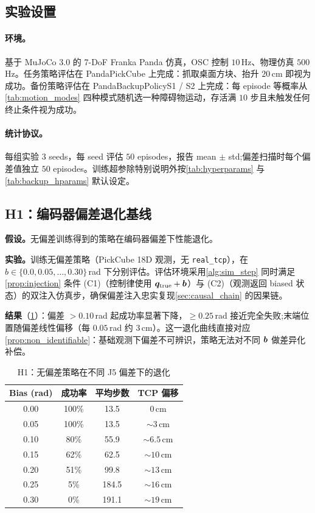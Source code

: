 \subsection{实验设置}\label{sec:sim_exp_setup}

\paragraph{环境。}基于 MuJoCo 3.0 的 7-DoF Franka Panda 仿真，OSC 控制 $10$\,Hz、物理仿真 $500$\,Hz。任务策略评估在 PandaPickCube 上完成：抓取桌面方块、抬升 $20$\,cm 即视为成功。备份策略评估在 PandaBackupPolicyS1 / S2 上完成：每 episode 等概率从 \cref{tab:motion_modes} 四种模式随机选一种障碍物运动，存活满 $10$ 步且未触发任何终止条件视为成功。

\paragraph{统计协议。}每组实验 $3$ seeds，每 seed 评估 $50$ episodes，报告 mean $\pm$ std;偏差扫描时每个偏差值独立 $50$ episodes。训练超参除特别说明外按\cref{tab:hyperparams} 与\cref{tab:backup_hparams} 默认设定。

\subsection{H1：编码器偏差退化基线}\label{sec:exp_h1}

\textbf{假设。}无偏差训练得到的策略在编码器偏差下性能退化。

\textbf{实验。}训练无偏差策略（PickCube 18D 观测，无 \texttt{real\_tcp}），在 $b \in \{0.0, 0.05, \ldots, 0.30\}$\,rad 下分别评估。评估环境采用\cref{alg:sim_step} 同时满足\cref{prop:injection} 条件 (C1)（控制律使用 $\bm{q}_\text{true}+\bm{b}$）与 (C2)（观测返回 biased 状态）的双注入仿真步，确保偏差注入忠实复现\cref{sec:causal_chain} 的因果链。

\textbf{结果}（\cref{tab:h1_degradation}）：偏差 $> 0.10$\,rad 起成功率显著下降，$\geq 0.25$\,rad 接近完全失败;末端位置随偏差线性偏移（每 $0.05$\,rad 约 $3$\,cm）。这一退化曲线直接对应\cref{prop:non_identifiable}：基础观测下偏差不可辨识，策略无法对不同 $\bm{b}$ 做差异化补偿。

\begin{table}[htbp]
  \centering
  \caption{H1：无偏差策略在不同 J5 偏差下的退化}
  \label{tab:h1_degradation}
  \footnotesize
  \begin{tabular}{@{}cccc@{}}
    \toprule
    Bias (rad) & 成功率 & 平均步数 & TCP 偏移 \\
    \midrule
    0.00 & 100\% & 13.5 & 0\,cm \\
    0.05 & 100\% & 13.5 & $\sim 3$\,cm \\
    0.10 & 80\%  & 55.9 & $\sim 6.5$\,cm \\
    0.15 & 62\%  & 62.5 & $\sim 10$\,cm \\
    0.20 & 51\%  & 99.8 & $\sim 13$\,cm \\
    0.25 & 5\%   & 184.5 & $\sim 16$\,cm \\
    0.30 & 0\%   & 191.1 & $\sim 19$\,cm \\
    \bottomrule
  \end{tabular}
\end{table}

